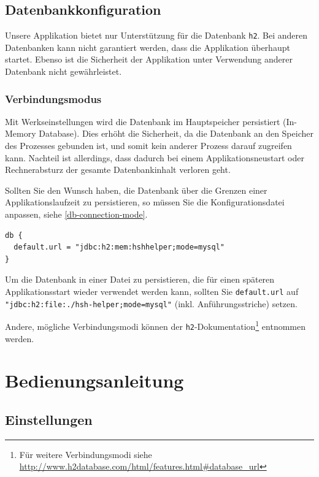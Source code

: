 \documentclass[12pt,DIV14,BCOR10mm,a4paper,parskip=half-,headsepline,headinclude,english,ngerman,bibliography=totocnumbered]{scrreprt}
\begin{document}
\section{Datenbankkonfiguration}

Unsere Applikation bietet nur Unterstützung für die Datenbank \texttt{h2}.
Bei anderen Datenbanken kann nicht garantiert werden, dass die Applikation überhaupt startet.
Ebenso ist die Sicherheit der Applikation unter Verwendung anderer Datenbank nicht gewährleistet.

\subsection{Verbindungsmodus}
Mit Werkseinstellungen wird die Datenbank im Hauptspeicher persistiert (In-Memory Database).
Dies erhöht die Sicherheit, da die Datenbank an den Speicher des Prozesses gebunden ist, und somit kein anderer Prozess darauf zugreifen kann.
Nachteil ist allerdings, dass dadurch bei einem Applikationsneustart oder Rechnerabsturz der gesamte Datenbankinhalt verloren geht.

Sollten Sie den Wunsch haben, die Datenbank über die Grenzen einer Applikationslaufzeit zu persistieren, so müssen Sie die Konfigurationsdatei anpassen, siehe \ref{db-connection-mode}.

\begin{lstlisting}[label=db-connection-mode, caption={Einstellung innerhalb der Konfigurationsdatei zum Anpassen des Verbindungsmodus der verwendeten Datenbank},captionpos=b]
db {
  default.url = "jdbc:h2:mem:hshhelper;mode=mysql"
}
\end{lstlisting}

\begin{sloppypar}
Um die Datenbank in einer Datei zu persistieren, die für einen späteren Applikationsstart wieder verwendet werden kann, sollten Sie \texttt{default.url} auf \texttt{"jdbc:h2:file:./hsh-helper;mode=mysql"} (inkl. Anführungsstriche) setzen.
\end{sloppypar}
Andere, mögliche Verbindungsmodi können der \texttt{h2}-Dokumentation\footnote{Für weitere Verbindungsmodi siehe \url{http://www.h2database.com/html/features.html\#database_url}} entnommen werden.

\chapter{Bedienungsanleitung}

\section{Einstellungen}
\end{document}
